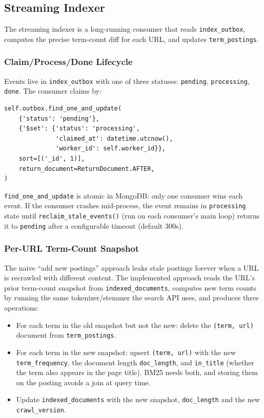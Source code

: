 \documentclass[11pt,a4paper]{article}
\newcommand{\code}[1]{\texttt{#1}}
\begin{document}
\subsection{Streaming Indexer}
\label{sec:streaming-indexer}

The streaming indexer is a long-running consumer that reads \code{index\_outbox}, computes the precise term-count diff for each URL, and updates \code{term\_postings}.

\subsubsection{Claim/Process/Done Lifecycle}

Events live in \code{index\_outbox} with one of three statuses: \code{pending}, \code{processing}, \code{done}. The consumer claims by:

\begin{lstlisting}
self.outbox.find_one_and_update(
    {'status': 'pending'},
    {'$set': {'status': 'processing',
              'claimed_at': datetime.utcnow(),
              'worker_id': self.worker_id}},
    sort=[('_id', 1)],
    return_document=ReturnDocument.AFTER,
)
\end{lstlisting}

\code{find\_one\_and\_update} is atomic in MongoDB: only one consumer wins each event. If the consumer crashes mid-process, the event remains in \code{processing} state until \code{reclaim\_stale\_events()} (run on each consumer's main loop) returns it to \code{pending} after a configurable timeout (default 300s).

\subsubsection{Per-URL Term-Count Snapshot}

The naive ``add new postings'' approach leaks stale postings forever when a URL is recrawled with different content. The implemented approach reads the URL's prior term-count snapshot from \code{indexed\_documents}, computes new term counts by running the same tokenizer/stemmer the search API uses, and produces three operations:

\begin{itemize}[leftmargin=1.4em]
  \item For each term in the old snapshot but not the new: delete the \code{(term, url)} document from \code{term\_postings}.
  \item For each term in the new snapshot: upsert \code{(term, url)} with the new \code{term\_frequency}, the document length \code{doc\_length}, and \code{in\_title} (whether the term also appears in the page title). BM25 needs both, and storing them on the posting avoids a join at query time.
  \item Update \code{indexed\_documents} with the new snapshot, \code{doc\_length} and the new \code{crawl\_version}.
\end{itemize}
\end{document}
